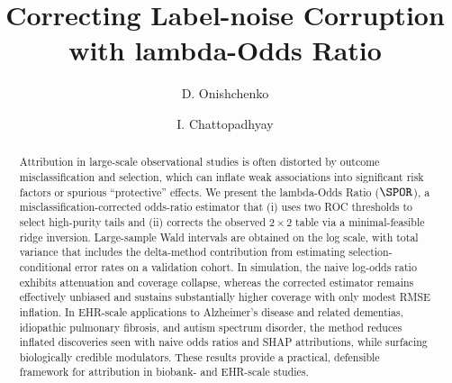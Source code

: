 \documentclass[lineno]{biometrika}
\title{\TITLE}
\def\TITLE{Correcting Label-noise Corruption     with   lambda-Odds Ratio}
\begin{document}



\title{\TITLE}

\author{D. Onishchenko}

\author{I. Chattopadhyay}


\maketitle

\begin{abstract}
Attribution in large-scale observational studies is often distorted by outcome misclassification and selection, which can inflate weak associations into significant risk factors or spurious ``protective'' effects. We present the lambda-Odds Ratio ($\SPOR$), a misclassification-corrected odds-ratio estimator that (i) uses two ROC thresholds to select high-purity tails and (ii) corrects the observed $2\times 2$ table via a minimal-feasible ridge inversion. Large-sample Wald intervals are obtained on the log scale, with total variance that includes the delta-method contribution from estimating selection-conditional error rates on a validation cohort. In simulation, the naive log-odds ratio exhibits attenuation and coverage collapse, whereas the corrected estimator remains effectively unbiased and sustains substantially higher coverage with only modest RMSE inflation. In EHR-scale applications to Alzheimer's disease and related dementias, idiopathic pulmonary fibrosis, and autism spectrum disorder, the method reduces inflated discoveries seen with naive odds ratios and SHAP attributions, while surfacing biologically credible modulators. These results provide a practical, defensible framework for attribution in biobank- and EHR-scale studies.
\end{abstract}
\end{document}

